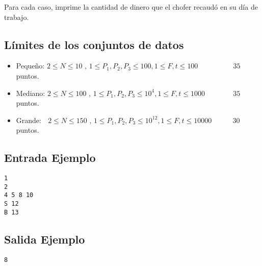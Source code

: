 Para cada caso, imprime la cantidad de dinero que el chofer recaudó en su día de trabajo.


\subsection*{Límites de los conjuntos de datos}

\begin{itemize}
    \item Pequeño: $ 2\leq N \leq 10 $ , $ 1\leq P_1, P_2,P_3 \leq 100, 1\leq F,t \leq 100 $ $\quad \quad \quad \quad \;$ $35$ puntos.
    \item Mediano: $ 2\leq N \leq 100 $ , $ 1\leq P_1, P_2,P_3 \leq 10^4, 1\leq F,t \leq 1000 $ $\quad \quad \quad \;$ $35$ puntos.
    \item Grande: $ \,\;\,  2\leq N \leq 150 $ , $ 1\leq P_1, P_2,P_3 \leq 10^{12}, 1\leq F,t \leq 10000 $ $\quad \quad \;$ $30$ puntos.
\end{itemize}

\begin{multicols}{2}
\subsection*{Entrada Ejemplo}
\begin{verbatim}
1
2
4 5 8 10
S 12
B 13
\end{verbatim}
\columnbreak
\subsection*{Salida Ejemplo}
\begin{verbatim}
8
\end{verbatim}
\end{multicols}



